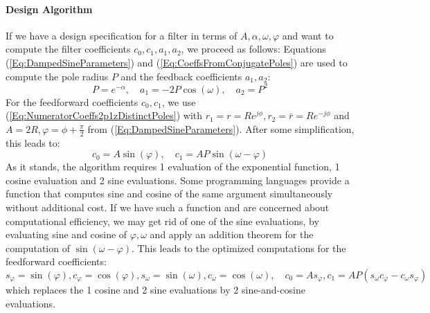 \paragraph{Design Algorithm} 
If we have a design specification for a filter in terms of $A, \alpha, \omega, \varphi$ and want to compute the filter coefficients $c_0, c_1, a_1, a_2$, we proceed as follows: Equations (\ref{Eq:DampedSineParameters}) and (\ref{Eq:CoeffsFromConjugatePoles}) are used to compute the pole radius $P$ and the feedback coefficients $a_1, a_2$:
\begin{equation}
\label{Eq:FeedbackCoeffsDampedSine}
\boxed
{
 P = e^{-\alpha}, \quad a_1 = -2 P \cos(\omega), \quad a_2 = P^2
}
\end{equation}
For the feedforward coefficients $c_0, c_1$, we use (\ref{Eq:NumeratorCoeffs2p1zDistinctPoles}) with $r_1 = r = R e^{j \phi}, r_2 = \bar{r} = R e^{-j \phi}$ and $A = 2R, \varphi = \phi + \frac{\pi}{2}$ from (\ref{Eq:DampedSineParameters}). After some simplification, this leads to:
\begin{equation}
\label{Eq:FeedforwardCoeffsDampedSine}
\boxed
{
 c_0 = A \sin(\varphi), \quad c_1 = A P \sin(\omega - \varphi)
}
\end{equation}
As it stands, the algorithm requires 1 evaluation of the exponential function, 1 cosine evaluation and 2 sine evaluations. Some programming languages provide a function that computes sine and cosine of the same argument simultaneously without additional cost. If we have such a function and are concerned about computational efficiency, we may get rid of one of the sine evaluations, by evaluating sine and cosine of $\varphi, \omega$ and apply an addition theorem for the computation of $\sin(\omega - \varphi)$. This leads to the optimized computations for the feedforward coefficients:
\begin{equation}
 s_\varphi = \sin(\varphi), c_\varphi = \cos(\varphi), s_\omega = \sin(\omega), c_\omega = \cos(\omega), \quad
 c_0 = A s_\varphi, c_1 = A P (s_\omega c_\varphi - c_\omega s_\varphi)
\end{equation}
which replaces the 1 cosine and 2 sine evaluations by 2 sine-and-cosine evaluations.

